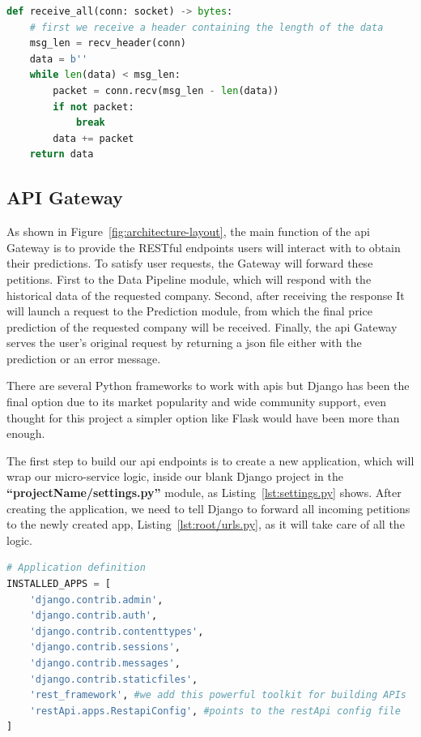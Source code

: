 \begin{lstlisting}[language=python,caption=Custom Implementation receiveall(),label={lst:receive-all}]
def receive_all(conn: socket) -> bytes:
    # first we receive a header containing the length of the data
    msg_len = recv_header(conn)
    data = b''
    while len(data) < msg_len:
        packet = conn.recv(msg_len - len(data))
        if not packet:
            break
        data += packet
    return data
\end{lstlisting}

\subsection{API Gateway}

As shown in Figure~\ref{fig:architecture-layout}, the main function of the \gls{api} Gateway is to provide the \gls{RESTful} endpoints users will interact with to obtain their predictions. To satisfy user requests, the Gateway will forward these petitions. First to the Data Pipeline module, which will respond with the historical data of the requested company. Second, after receiving the response It will launch a request to the Prediction module, from which the final price prediction of the requested company will be received. Finally, the \gls{api} Gateway serves the user's original request by returning a \gls{json} file either with the prediction or an error message.

There are several Python frameworks to work with \glspl{api} but \gls{Django} has been the final option due to its market popularity and wide community support, even thought for this project a simpler option like Flask would have been more than enough.

The first step to build our \gls{api} endpoints is to create a new application, which will wrap our micro-service logic, inside our blank Django project in the \textbf{\enquote{projectName/settings.py}} module, as Listing~\ref{lst:settings.py} shows. After creating the application, we need to tell Django to forward all incoming petitions to the newly created app, Listing~\ref{lst:root/urls.py}, as it will take care of all the logic.\newpage

\begin{lstlisting}[language=python,caption=apiGateway/settings.py,label={lst:settings.py}]
# Application definition
INSTALLED_APPS = [
    'django.contrib.admin',
    'django.contrib.auth',
    'django.contrib.contenttypes',
    'django.contrib.sessions',
    'django.contrib.messages',
    'django.contrib.staticfiles',
    'rest_framework', #we add this powerful toolkit for building APIs
    'restApi.apps.RestapiConfig', #points to the restApi config file
]
\end{lstlisting}

